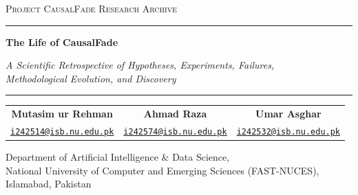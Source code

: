 \begin{titlepage}
\centering
\vspace*{0.4cm}
{\scshape\large Project CausalFade Research Archive \par}
\vspace{0.45cm}
{\color{cfnavy}\rule{\textwidth}{1.8pt}\par}
\vspace{0.4cm}
{\Huge\bfseries\color{cfnavy} The Life of CausalFade \par}
\vspace{0.3cm}
{\large\itshape\color{cfteal} A Scientific Retrospective of Hypotheses, Experiments, Failures,\\Methodological Evolution, and Discovery \par}
\vspace{0.4cm}
{\color{cfnavy}\rule{\textwidth}{1.8pt}\par}
\vspace{0.75cm}

{\normalsize
\begin{tabular}{@{}ccc@{}}
\textbf{\large\color{cfnavy} Mutasim ur Rehman} &
\textbf{\large\color{cfnavy} Ahmad Raza} &
\textbf{\large\color{cfnavy} Umar Asghar} \\[3pt]
\footnotesize\href{mailto:i242514@isb.nu.edu.pk}{\texttt{i242514@isb.nu.edu.pk}} &
\footnotesize\href{mailto:i242574@isb.nu.edu.pk}{\texttt{i242574@isb.nu.edu.pk}} &
\footnotesize\href{mailto:i242532@isb.nu.edu.pk}{\texttt{i242532@isb.nu.edu.pk}}
\end{tabular}\par}
\vspace{0.35cm}
{\small\color{cfslate}
Department of Artificial Intelligence \& Data Science,\\
National University of Computer and Emerging Sciences (FAST-NUCES),\\
Islamabad, Pakistan\par}

\vspace{0.85cm}


\end{titlepage}

